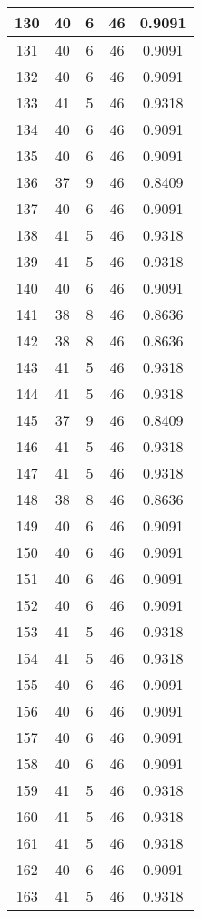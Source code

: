\documentclass[letterpaper, 12pt]{article}
\begin{document}
\begin{longtable}{|c|c|c|c|c|}
\hline
130 & 40 & 6 & 46 & 0.9091 \\
\hline
131 & 40 & 6 & 46 & 0.9091 \\
\hline
132 & 40 & 6 & 46 & 0.9091 \\
\hline
133 & 41 & 5 & 46 & 0.9318 \\
\hline
134 & 40 & 6 & 46 & 0.9091 \\
\hline
135 & 40 & 6 & 46 & 0.9091 \\
\hline
136 & 37 & 9 & 46 & 0.8409 \\
\hline
137 & 40 & 6 & 46 & 0.9091 \\
\hline
138 & 41 & 5 & 46 & 0.9318 \\
\hline
139 & 41 & 5 & 46 & 0.9318 \\
\hline
140 & 40 & 6 & 46 & 0.9091 \\
\hline
141 & 38 & 8 & 46 & 0.8636 \\
\hline
142 & 38 & 8 & 46 & 0.8636 \\
\hline
143 & 41 & 5 & 46 & 0.9318 \\
\hline
144 & 41 & 5 & 46 & 0.9318 \\
\hline
145 & 37 & 9 & 46 & 0.8409 \\
\hline
146 & 41 & 5 & 46 & 0.9318 \\
\hline
147 & 41 & 5 & 46 & 0.9318 \\
\hline
148 & 38 & 8 & 46 & 0.8636 \\
\hline
149 & 40 & 6 & 46 & 0.9091 \\
\hline
150 & 40 & 6 & 46 & 0.9091 \\
\hline
151 & 40 & 6 & 46 & 0.9091 \\
\hline
152 & 40 & 6 & 46 & 0.9091 \\
\hline
153 & 41 & 5 & 46 & 0.9318 \\
\hline
154 & 41 & 5 & 46 & 0.9318 \\
\hline
155 & 40 & 6 & 46 & 0.9091 \\
\hline
156 & 40 & 6 & 46 & 0.9091 \\
\hline
157 & 40 & 6 & 46 & 0.9091 \\
\hline
158 & 40 & 6 & 46 & 0.9091 \\
\hline
159 & 41 & 5 & 46 & 0.9318 \\
\hline
160 & 41 & 5 & 46 & 0.9318 \\
\hline
161 & 41 & 5 & 46 & 0.9318 \\
\hline
162 & 40 & 6 & 46 & 0.9091 \\
\hline
163 & 41 & 5 & 46 & 0.9318 \\

\end{longtable}
\end{document}
